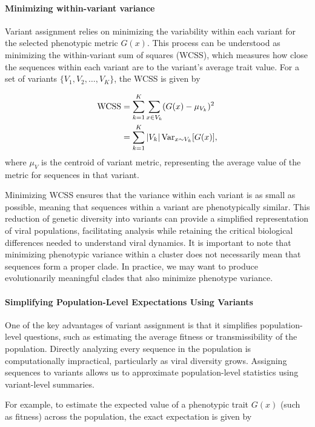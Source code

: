 \paragraph{Minimizing within-variant variance}

Variant assignment relies on minimizing the variability within each variant for the selected phenotypic metric $G(x)$.
This process can be understood as minimizing the within-variant sum of squares (WCSS), which measures how close the sequences within each variant are to the variant’s average trait value.
For a set of variants \( \{V_1, V_2, \dots, V_K\} \), the WCSS is given by

\begin{align}
\text{WCSS} &= \sum_{k=1}^{K} \sum_{x \in V_{k}} (G(x) - \mu_{V_k})^2\\
            &= \sum_{k=1}^{K} \left| V_k \right| \text{Var}_{x \sim V_k}[G(x)],
\end{align}
where $\mu_V$ is the centroid of variant metric, representing the average value of the metric for sequences in that variant.

Minimizing WCSS ensures that the variance within each variant is as small as possible, meaning that sequences within a variant are phenotypically similar.
This reduction of genetic diversity into variants can provide a simplified representation of viral populations, facilitating analysis while retaining the critical biological differences needed to understand viral dynamics.
It is important to note that minimizing phenotypic variance within a cluster does not necessarily mean that sequences form a proper clade.
In practice, we may want to produce evolutionarily meaningful clades that also minimize phenotype variance.

\paragraph{Simplifying Population-Level Expectations Using Variants}

One of the key advantages of variant assignment is that it simplifies population-level questions, such as estimating the average fitness or transmissibility of the population. 
Directly analyzing every sequence in the population is computationally impractical, particularly as viral diversity grows. Assigning sequences to variants allows us to approximate population-level statistics using variant-level summaries.

For example, to estimate the expected value of a phenotypic trait $G(x)$ (such as fitness) across the population, the exact expectation is given by

